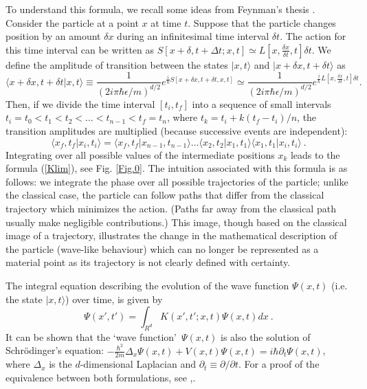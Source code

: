 \documentclass[12pt]{article}   %
\begin{document}
To understand this formula, we recall some ideas from Feynman's
thesis \cite{Feynman2}. Consider the particle at a point $x$ at
time $t$. Suppose that the particle changes position by an amount
$\delta x$ during an infinitesimal time interval $\delta t$. The
action for this time interval can be written as $S[x+\delta,t+\Delta t;x,t] 
\simeq L[x,\frac{\delta x}{\delta t},t] \delta t$.
We define the amplitude of transition between the states
$|x,t\rangle $ and $|x+\delta x,t+\delta t\rangle $ as $$ \langle
x+\delta x,t+\delta t|x,t\rangle \equiv
\frac{1}{(2i\pi \hbar\epsilon/m)^{d/2}}
e^{\frac{i}{\hbar}S[x+\delta x,t+\delta t,x,t]}
\simeq\frac{1}{(2i\pi \hbar\epsilon/m)^{d/2}}
e^{\frac{i}{\hbar}L[x,\frac{\delta x}{\delta t},t]\delta t} .
$$ Then, if we divide the time interval $[t_i, t_f]$ into a
sequence of small intervals $t_i=t_0 < t_1 < t_2 < \ldots <
t_{n-1} < t_f=t_n $, where $t_k=t_i + k(t_f-t_i)/n$, the
transition amplitudes are multiplied (because successive events
are independent): $$ \langle x_f,t_f|x_i,t_i\rangle = \langle
x_f,t_f|x_{n-1},t_{n-1}\rangle \ldots \langle
x_2,t_2|x_1,t_1\rangle  \langle x_1,t_1|x_i,t_i\rangle\ .$$
Integrating over all possible values of the intermediate positions
$x_k$ leads to the formula (\ref{Klim}), see Fig. \ref{Fig.0}. The intuition associated
with this formula is as follows: we integrate the phase over all
possible trajectories of the particle; unlike the classical case,
the particle can follow paths that differ from the classical
trajectory which minimizes the action. (Paths far away from the
classical path usually make negligible contributions.) This image,
though based on the classical image of a trajectory, illustrates
the change in the mathematical description of the particle
(wave-like behaviour) which can no longer be represented as a
material point as its trajectory is not clearly defined with
certainty.

The integral equation describing the evolution of the wave
function $\Psi(x,t)$ (i.e. the state $|x,t\rangle$) over time, is
given by
\begin{equation}\label{ShroInt}
\Psi(x',t')=\int_{R^d} K(x',t';x,t)\Psi(x,t) dx\ .
\end{equation}
It can be shown that the \lq wave function\rq\ $\Psi(x,t)$ is also
the solution of Schr\"odinger's equation:
$-\frac{\hbar^2}{2m}\Delta_x\Psi(x,t)+V(x,t)\Psi(x,t)=i\hbar\partial_t\Psi(x,t)$,
where $\Delta_x$ is the $d$-dimensional Laplacian and
$\partial_t\equiv\partial/\partial t$. For a proof of the
equivalence between both formulations, see
\cite{FH},\cite{Feynman2}.
\end{document}
